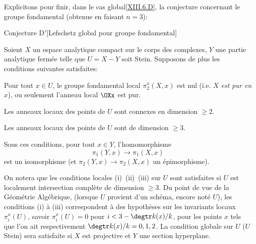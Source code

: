 Explicitons pour finir, dans le \og cas global\fg \ref{XIII.6.D}, la conjecture concernant le groupe fondamental (obtenue en faisant $n=3$):


\label{XIII.6.D'}
\begin{enonce*}{Conjecture D$\boldsymbol'$}[Lefschetz global pour groupe fondamental\ndemark]

Soient $X$ un espace analytique compact sur le corps des complexes, $Y$ une partie analytique ferm\'ee telle que $U=X-Y$ soit Stein. Supposons de plus les conditions suivantes satisfaites:
\begin{enumeratei}
\item
Pour tout $x\in U$, le groupe fondamental local $\pi_2^x(X, x)$ est nul (i.e. $X$ \emph{est \og pur en }$x${\fg}), ou seulement l'anneau local $\OXx$ est pur.
\item
Les anneaux locaux des points de $U$ sont \og connexes en dimension $\geq 2$\fg.
\item
Les anneaux locaux des points de $U$ sont de dimension $\geq 3$.
\end{enumeratei}

Sous ces conditions, pour tout $x\in Y$, l'homomorphisme
$$
\pi_1(Y, x)\to\pi_1(X, x)
$$
est un isomorphisme (et $\pi_2(Y, x)\to\pi_2(X, x)$ un \'epimorphisme).
\end{enonce*}

On notera que les conditions locales (i)~(ii)~(iii) sur $U$ sont satisfaites si $U$ est localement intersection compl\`ete de dimension $\geq 3$. Du point de vue de la G\'eom\'etrie Alg\'ebrique, (lorsque $U$ provient d'un sch\'ema, encore not\'e $U$), les conditions (i) \`a (iii) correspondent \`a des hypoth\`eses sur les invariants locaux $\pi_i^x(U)$, \ignorespaces savoir \hbox{$\pi_i^x(U)=0$} pour $i<3-\degtr k(x)/k$, pour les points $x$ tels que l'on ait respectivement $\degtr k(x)/k=0, 1, 2$. La condition globale sur $U$ ($U$ Stein) sera satisfaite si $X$ est projective et $Y$ une section hyperplane.

